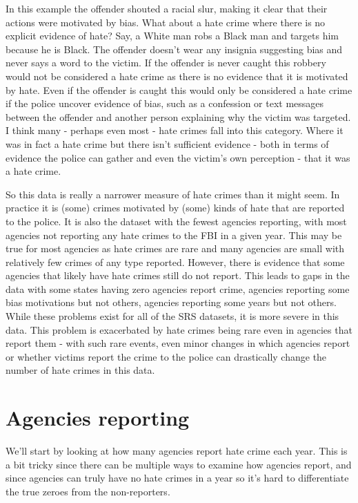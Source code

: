 \documentclass[
  12pt,
  openany]{book}
\begin{document}
In this example the offender shouted a racial slur, making it clear that their actions were motivated by bias. What about a hate crime where there is no explicit evidence of hate? Say, a White man robs a Black man and targets him because he is Black. The offender doesn't wear any insignia suggesting bias and never says a word to the victim. If the offender is never caught this robbery would not be considered a hate crime as there is no evidence that it is motivated by hate. Even if the offender is caught this would only be considered a hate crime if the police uncover evidence of bias, such as a confession or text messages between the offender and another person explaining why the victim was targeted. I think many - perhaps even most - hate crimes fall into this category. Where it was in fact a hate crime but there isn't sufficient evidence - both in terms of evidence the police can gather and even the victim's own perception - that it was a hate crime.

So this data is really a narrower measure of hate crimes than it might seem. In practice it is (some) crimes motivated by (some) kinds of hate that are reported to the police. It is also the dataset with the fewest agencies reporting, with most agencies not reporting any hate crimes to the FBI in a given year. This may be true for most agencies as hate crimes are rare and many agencies are small with relatively few crimes of any type reported. However, there is evidence that some agencies that likely have hate crimes still do not report. This leads to gaps in the data with some states having zero agencies report crime, agencies reporting some bias motivations but not others, agencies reporting some years but not others. While these problems exist for all of the SRS datasets, it is more severe in this data. This problem is exacerbated by hate crimes being rare even in agencies that report them - with such rare events, even minor changes in which agencies report or whether victims report the crime to the police can drastically change the number of hate crimes in this data.

\section{Agencies reporting}\label{agencies-reporting-5}

We'll start by looking at how many agencies report hate crime each year. This is a bit tricky since there can be multiple ways to examine how agencies report, and since agencies can truly have no hate crimes in a year so it's hard to differentiate the true zeroes from the non-reporters.
\end{document}
